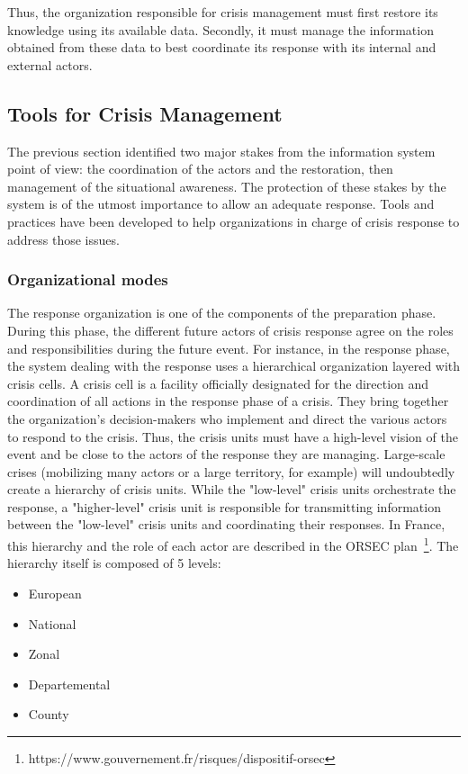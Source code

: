 Thus, the organization responsible for crisis management must first restore its knowledge using its available data.
Secondly, it must manage the information obtained from these data to best coordinate its response with its internal and external actors.

\subsection{Tools for Crisis Management}
The previous section identified two major stakes from the information system point of view: the coordination of the actors and the restoration, then management of the situational awareness.
The protection of these stakes by the system is of the utmost importance to allow an adequate response.
Tools and practices have been developed to help organizations in charge of crisis response to address those issues.

\subsubsection{Organizational modes}
The response organization is one of the components of the preparation phase.
During this phase, the different future actors of crisis response agree on the roles and responsibilities during the future event.
For instance, in the response phase, the system dealing with the response uses a hierarchical organization layered with crisis cells.
A crisis cell is a facility officially designated for the direction and coordination of all actions in the response phase of a crisis.
They bring together the organization's decision-makers who implement and direct the various actors to respond to the crisis.
Thus, the crisis units must have a high-level vision of the event and be close to the actors of the response they are managing.
Large-scale crises (mobilizing many actors or a large territory, for example) will undoubtedly create a hierarchy of crisis units.
While the "low-level" crisis units orchestrate the response, a "higher-level" crisis unit is responsible for transmitting information between the "low-level" crisis units and coordinating their responses.
In France, this hierarchy and the role of each actor are described in the ORSEC plan~\footnote{https://www.gouvernement.fr/risques/dispositif-orsec}.
The hierarchy itself is composed of 5 levels:

\begin{itemize}
    \item European
    \item National
    \item Zonal
    \item Departemental
    \item County
\end{itemize}

